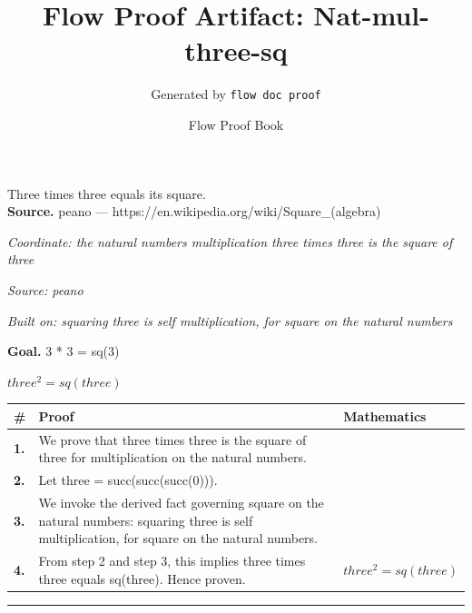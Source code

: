 \documentclass[11pt]{article}
\title{Flow Proof Artifact: Nat-mul-three-sq}
\author{Generated by \texttt{flow doc proof}}
\date{Flow Proof Book}
\theoremstyle{definition}
\begin{document}
\maketitle
Three times three equals its square.\\[0.5em]
\textbf{Source.} peano — https://en.wikipedia.org/wiki/Square\_(algebra)\\[0.5em]
\bigskip
{}\par
\smallskip\noindent\textit{Coordinate: the natural numbers \cdot multiplication \cdot three times three is the square of three}\par
\smallskip\noindent\textit{Source: peano}\par
\smallskip\noindent\textit{Built on: squaring three is self multiplication, for square on the natural numbers}\par
\medskip
\noindent\textbf{Goal.} 3 * 3 = sq(3)\par
\noindent$\displaystyle three^{2} = sq(three)$\par
\medskip
\noindent
\begin{tabular}{@{} >{\raggedright\arraybackslash}p{} >{\raggedright\arraybackslash}p{} >{\raggedleft\arraybackslash}p{} @{}}
\textbf{\#} & \textbf{Proof} & \textbf{Mathematics} \\
\midrule
\textbf{1.} & We prove that three times three is the square of three for multiplication on the natural numbers. & \\[0.45em]
\textbf{2.} & Let three = succ(succ(succ(0))). & \\[0.45em]
\textbf{3.} & We invoke the derived fact governing square on the natural numbers: squaring three is self multiplication, for square on the natural numbers. & \\[0.45em]
\textbf{4.} & From step 2 and step 3, this implies three times three equals sq(three). Hence proven. & $\displaystyle three^{2} = sq(three)$ \\[0.45em]
\bottomrule
\end{tabular}
\label{thm:Nat-multiplication-three_times_three_is_the_square_of_three}
\par\medskip\hrule
\end{document}
